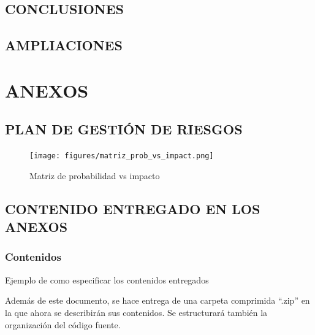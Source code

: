 \documentclass[11pt]{report} %
\begin{document}
\section{CONCLUSIONES}

\newpage
\section{AMPLIACIONES} 


\newpage
\chapter*{ANEXOS}
\newpage
{}\label{plan_de_gestion_de_riesgos}
\section*{PLAN DE GESTIÓN DE RIESGOS}
\begin{figure}[H]
    \centering
    \texttt{[image: figures/matriz\_prob\_vs\_impact.png]}
    \caption{Matriz de probabilidad vs impacto}
    \label{fig:matriz_prob_vs_impact}
\end{figure}
\newpage
\section*{CONTENIDO ENTREGADO EN LOS ANEXOS} 

\subsection*{Contenidos} 

\textcolor[rgb]{0.65,0.16,0}{Ejemplo de como especificar los contenidos entregados}

Además de este documento, se hace entrega de una carpeta comprimida ``.zip'' en la que ahora se describirán sus contenidos. Se estructurará también la organización del código fuente.
\end{document}
